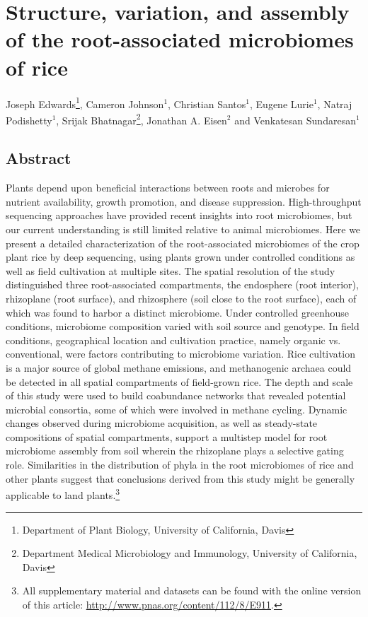 \chapter{Structure, variation, and assembly of the root-associated microbiomes of rice}

Joseph Edwards\footnote[1]{Department of Plant Biology, University of California, Davis}, Cameron Johnson$^1$, Christian Santos$^1$, Eugene Lurie$^1$, Natraj Podishetty$^1$, Srijak Bhatnagar\footnote[2]{Department Medical Microbiology and Immunology, University of California, Davis}, Jonathan A. Eisen$^2$ and Venkatesan Sundaresan$^1$

\section{Abstract}
Plants depend upon beneficial interactions between roots and microbes for nutrient availability, growth promotion, and disease suppression. High-throughput sequencing approaches have provided recent insights into root microbiomes, but our current understanding is still limited relative to animal microbiomes. Here we present a detailed characterization of the root-associated microbiomes of the crop plant rice by deep sequencing, using plants grown under controlled conditions as well as field cultivation at multiple sites. The spatial resolution of the study distinguished three root-associated compartments, the endosphere (root interior), rhizoplane (root surface), and rhizosphere (soil close to the root surface), each of which was found to harbor a distinct microbiome. Under controlled greenhouse conditions, microbiome composition varied with soil source and genotype. In field conditions, geographical location and cultivation practice, namely organic vs. conventional, were factors contributing to microbiome variation. Rice cultivation is a major source of global methane emissions, and methanogenic archaea could be detected in all spatial compartments of field-grown rice. The depth and scale of this study were used to build coabundance networks that revealed potential microbial consortia, some of which were involved in methane cycling. Dynamic changes observed during microbiome acquisition, as well as steady-state compositions of spatial compartments, support a multistep model for root microbiome assembly from soil wherein the rhizoplane plays a selective gating role. Similarities in the distribution of phyla in the root microbiomes of rice and other plants suggest that conclusions derived from this study might be generally applicable to land plants.\footnote[3]{All supplementary material and datasets can be found with the online version of this article: \url{http://www.pnas.org/content/112/8/E911}.}